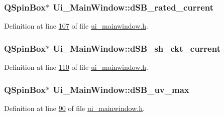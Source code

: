 \hypertarget{a00027_ab6d7c3a292c79cd73aff8735df48d30e}{
\subsubsection[{d\+S\+B\+\_\+rated\+\_\+current}]{\setlength{\rightskip}{0pt plus 5cm}Q\+Spin\+Box$\ast$ Ui\+\_\+\+Main\+Window\+::d\+S\+B\+\_\+rated\+\_\+current}}\label{a00027_ab6d7c3a292c79cd73aff8735df48d30e}


Definition at line \hyperlink{a00052_source_l00107}{107} of file \hyperlink{a00052_source}{ui\+\_\+mainwindow.\+h}.

\hypertarget{a00027_aab5fcfd5ceedb9c4e853139113f5c753}{
\subsubsection[{d\+S\+B\+\_\+sh\+\_\+ckt\+\_\+current}]{\setlength{\rightskip}{0pt plus 5cm}Q\+Spin\+Box$\ast$ Ui\+\_\+\+Main\+Window\+::d\+S\+B\+\_\+sh\+\_\+ckt\+\_\+current}}\label{a00027_aab5fcfd5ceedb9c4e853139113f5c753}


Definition at line \hyperlink{a00052_source_l00110}{110} of file \hyperlink{a00052_source}{ui\+\_\+mainwindow.\+h}.

\hypertarget{a00027_aa2872ada374dace81c4f1cc41d8e244d}{
\subsubsection[{d\+S\+B\+\_\+uv\+\_\+max}]{\setlength{\rightskip}{0pt plus 5cm}Q\+Spin\+Box$\ast$ Ui\+\_\+\+Main\+Window\+::d\+S\+B\+\_\+uv\+\_\+max}}\label{a00027_aa2872ada374dace81c4f1cc41d8e244d}


Definition at line \hyperlink{a00052_source_l00090}{90} of file \hyperlink{a00052_source}{ui\+\_\+mainwindow.\+h}.

